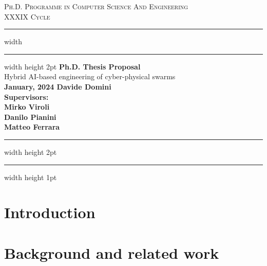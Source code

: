 \documentclass[12pt]{article}
\begin{document}
\begin{titlepage}

	\newcommand{\HRule}{\rule{\linewidth}{0.5mm}}
	\center
	
	\textsc{\Large Ph.D. Programme in Computer Science And Engineering}\\[0.5cm]
	
	\textsc{\Large XXXIX Cycle}\\[0.6cm]
	
	\hrule width \hsize \kern 1mm \hrule width \hsize height 2pt 
	\vspace{0.8cm}
	{ \large \bfseries Ph.D. Thesis Proposal}\\[0.6cm]
	{ \large Hybrid AI-based engineering of cyber-physical swarms}\\[0.6cm]
	
	
	
	{\bfseries{January, 2024}
	\hfill
	\bfseries{Davide Domini}}\\[0.6cm]
	
	{\bfseries{Supervisors}: \\ [0.1cm]
	Mirko Viroli \\
	Danilo Pianini \\
	Matteo Ferrara
	} \\[0.6cm]

	\hrule width \hsize height 2pt \kern 1mm \hrule width \hsize height 1pt
	\vspace{0.4cm}
	
\end{titlepage}

\section{Introduction}\label{sec:intro}

\section{Background and related work}\label{sec:related}
\end{document}
